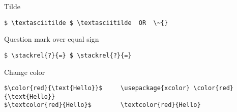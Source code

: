 \documentclass[12pt]{article}
\begin{document}
Tilde
\begin{lstlisting}[mathescape]
$ \textasciitilde $	\textasciitilde  OR  \~{}
\end{lstlisting}

Question mark over equal sign
\begin{lstlisting}[mathescape]
$ \stackrel{?}{=} $	\stackrel{?}{=}
\end{lstlisting}

Change color
\begin{lstlisting}[mathescape]
$\color{red}{\text{Hello}}$		\usepackage{xcolor} \color{red}{\text{Hello}}
$\textcolor{red}{Hello}$		\textcolor{red}{Hello}
\end{lstlisting}

\begin{lstlisting}[mathescape]
\end{lstlisting}

\begin{comment}
\end{comment}
\end{document}

